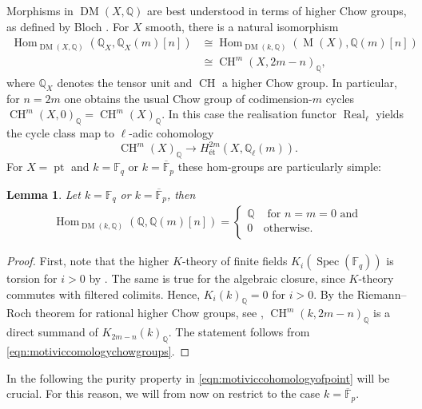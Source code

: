\documentclass{amsart}
\theoremstyle{plain}
\newtheorem{lemma}[theorem]{Lemma}
\theoremstyle{TheoremNum}
\theoremstyle{definition}
\theoremstyle{remark}
\numberwithin{equation}{section}
\newcommand{\F}{\mathbb{F}}
\newcommand{\Q}{\mathbb{Q}}
\newcommand{\un}{\Q}
\newcommand{\Chow}{\operatorname{CH}}
\newcommand{\Mot}{\operatorname{M}}
\newcommand{\DM}{\operatorname{DM}}
\newcommand{\Hom}{\operatorname{Hom}}
\newcommand{\poi}{\operatorname{pt}}
\newcommand{\Spec}{\operatorname{Spec}}
\newcommand{\Real}{\operatorname{Real}}
\begin{document}
Morphisms in $\DM(X,\Q)$ are best understood in terms of higher Chow groups, as defined by Bloch \cite{bloch_algebraic_1986}. For $X$ smooth, there is a natural isomorphism
\begin{align}
    \Hom_{\DM(X,\Q)}(\un_X,\un_X(m)[n])&\cong\Hom_{\DM(k,\Q)}(\Mot(X),\un(m)[n])\nonumber\\
    &\cong\Chow^m(X,2m-n)_\Q,\label{eqn:motiviccomologychowgroups}
\end{align}
where $\Q_X$ denotes the tensor unit and $\Chow$ a higher Chow group. In particular, for $n=2m$ one obtains the usual Chow group of codimension-$m$ cycles $\Chow^m(X,0)_\Q=\Chow^m(X)_\Q.$ In this case the realisation functor $\Real_\ell$ yields the cycle class map to $\ell$-adic cohomology
$$\Chow^m(X)_\Q\to H^{2m}_{\text{\'et}}(X,\Q_\ell(m)).$$
For $X=\poi$ and $k=\F_q$ or $k=\overline{\F}_p$ these hom-groups are particularly simple:
\begin{lemma}\label{lem:motiviccohomologyofpoint} Let $k=\F_q$ or $k=\overline{\F}_p$, then
\begin{align}\label{eqn:motiviccohomologyofpoint}
    \Hom_{\DM(k,\Q)}(\un,\un(m)[n])=\left\{
\begin{array}{cl}
\Q & \text{ for }n=m=0 \text{ and} \\
0 &  \text{otherwise.} \\
\end{array}
\right.
\end{align}
\end{lemma}
\begin{proof}
First, note that the higher $K$-theory of finite fields $K_i(\Spec(\mathbb{F}_q))$ is torsion for $i>0$ by \cite[Theorem 8]{quillen_cohomology_1972}. The same is true for the algebraic closure, since $K$-theory commutes with filtered colimits. Hence, $K_i(k)_\Q=0$ for $i>0.$
By the Riemann--Roch theorem for rational higher Chow groups, see \cite[Theorem 9.1]{bloch_algebraic_1986}, $\Chow^m(k,2m-n)_\Q$ is a direct summand of $K_{2m-n}(k)_\Q.$
The statement follows from  \eqref{eqn:motiviccomologychowgroups}.
\end{proof}
In the following the purity property in  \eqref{eqn:motiviccohomologyofpoint} will be crucial.
For this reason, we will from now on restrict to the case $k=\overline{\F}_p.$
\end{document}
